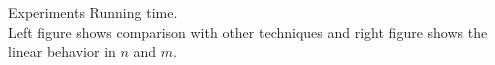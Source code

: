 \documentclass[first=dgreen,second=purple,logo=redque]{aaltoslides}
\begin{document}
\begin{frame}[allowframebreaks=1]{Experiments}
\framebreak
Running time. \\
Left figure shows comparison with other techniques and right figure shows the linear behavior in $n$ and $m$.
\begin{figure}
 \label{fig:fgtree}
\end{figure}
\end{frame}
\end{document}
